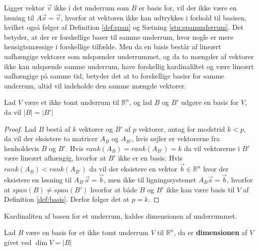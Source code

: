 Ligger vektor $\vec{v}$ ikke i det underrum som $B$ er basis for, vil der ikke være en løsning til $A \vec{x} =\vec{v}$, hvorfor at vektoren ikke kan udtrykkes i forhold til basisen, hvilket også følger af Definition \ref{def:span} og Sætning \ref{stn:spanunderrum}.
Det betyder, at der er forskellige baser til samme underrum, hvor nogle er mere hensigtsmæssige i forskellige tilfælde.
Men da en basis består af lineært uafhængige vektorer som udspænder underrummet, og da to mængder af vektorer ikke kan udspænde samme underrum, have forskellig kardinaliltet og være lineært uafhængige på samme tid, betyder det at to forskellige basisr for samme underrum, altid vil indeholde den samme mængde vektorer.
\begin{stn}
Lad $V$ være et ikke tomt underrum til $\mathds{R}^n$, og lad $B$ og $B'$ udgøre en basis for $V$, da vil $|B|=|B'|$
\label{stn:basiskardinalitet}
\end{stn}
\begin{proof}
Lad $B$ bestå af $k$ vektorer og $B'$ af $p$ vektorer, antag for modstrid $k < p$, da vil der eksistere to matricer $A_{B}$ og $A_{B'}$, hvis søjler er vektorerne fra henholdsvis $B$ og $B'$.
Hvis $rank(A_{B}) = rank(A_{B'}) = k$ da vil vektorerne i $B'$ være lineært afhængig, hvorfor at $B'$ ikke er en basis.
Hvis $rank(A_{B}) < rank(A_{B'} )$ da vil der eksistere en vektor $\vec{b} \in \mathds{R}^n$ hvor der eksistere en løsning til $A_{B'}\vec{x} = \vec{b}$, men ikke til ligningssystemet $A_B \vec{x}=\vec{b}$, hvorfor at $span(B) \neq span(B')$ hvorfor at både $B$ og $B'$ ikke kan være basis til $V$ af Definition \ref{def:basis}.
Derfor følger det at $p=k$.
\end{proof}
Kardinaliten af basen for et underrum, kaldes dimensionen af underrummet.
\begin{defn}[Dimension]
Lad $B$ være en basis for et ikke tomt underrum $V$ til $\mathds{R}^n$, da er \textbf{dimensionen} af $V$ givet ved $\dim{V} = |B|$
\label{def:dim}
\end{defn}






